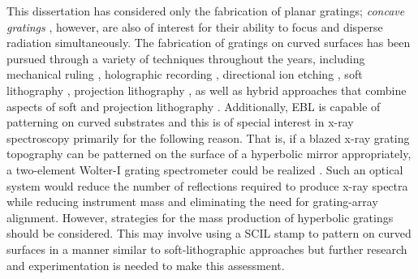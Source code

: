 This dissertation has considered only the fabrication of planar gratings; \emph{concave gratings} \cite{Loewen97}, however, are also of interest for their ability to focus and disperse radiation simultaneously. 
The fabrication of gratings on curved surfaces has been pursued through a variety of techniques throughout the years, including mechanical ruling \cite{Harada80,Kita83,Kita92}, holographic recording \cite{Sokolova04}, directional ion etching \cite{Liu15,Guo18}, soft lithography \cite{Xia98,Paul03,Choi04}, projection lithography \cite{Klosner02}, as well as hybrid approaches that combine aspects of soft and projection lithography \cite{Kim09,Park12}. 
Additionally, EBL is capable of patterning on curved substrates \cite{Wilson03,PSU_MRI_EBL,Lee18,Arat19} and this is of special interest in x-ray spectroscopy primarily for the following reason. 
That is, if a blazed x-ray grating topography can be patterned on the surface of a hyperbolic mirror appropriately, a two-element Wolter-I grating spectrometer could be realized \cite{DeRoo19,DeRoo19b}. 
Such an optical system would reduce the number of reflections required to produce x-ray spectra while reducing instrument mass and eliminating the need for grating-array alignment. 
However, strategies for the mass production of hyperbolic gratings should be considered. 
This may involve using a SCIL stamp to pattern on curved surfaces in a manner similar to soft-lithographic approaches \cite{Paul03,Choi04} but further research and experimentation is needed to make this assessment. 

